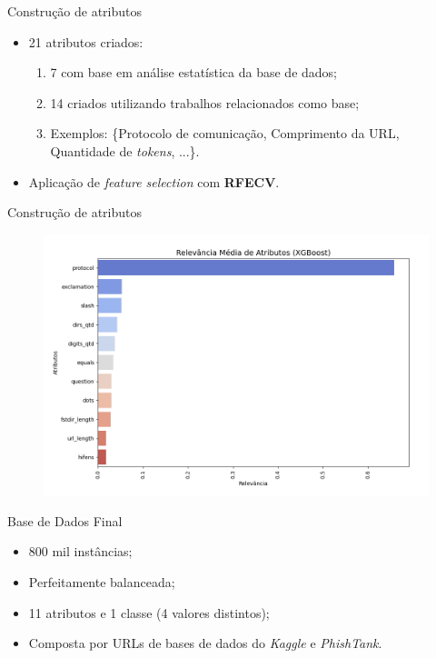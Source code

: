 \documentclass{beamer}
\begin{document}
\begin{frame}{Construção de atributos}
    
    \begin{itemize}
        \setlength{\itemsep}{10pt}
        \item 21 atributos criados:
        \begin{enumerate}
            \vspace{0.2cm}
            \setlength{\itemsep}{10pt}
            \item 7 com base em análise estatística da base de dados;
            \item 14 criados utilizando trabalhos relacionados como base;
            \item Exemplos: \{Protocolo de comunicação, Comprimento da URL, Quantidade de \emph{tokens}, ...\}.
        \end{enumerate}
        \item Aplicação de \emph{feature selection} com \textbf{RFECV}.
    \end{itemize}
    
\end{frame}

\begin{frame}{Construção de atributos}
    
    \begin{figure}
        \centering
        \includegraphics[width=1\textwidth]{pic/attr.png}
        \label{fig:map2}
    \end{figure}
    
\end{frame}

\begin{frame}{Base de Dados Final}
    
    \begin{itemize}
        \setlength{\itemsep}{10pt}
        \item 800 mil instâncias;
        \item Perfeitamente balanceada;
        \item 11 atributos e 1 classe (4 valores distintos);
        \item Composta por URLs de bases de dados do \emph{Kaggle} e \emph{PhishTank}.
    \end{itemize}
    
\end{frame}
\end{document}
